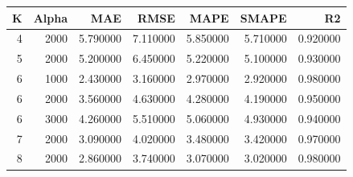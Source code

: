 \begin{tabular}{rrrrrrr}
\toprule
K & Alpha & MAE & RMSE & MAPE & SMAPE & R2 \\
\midrule
4 & 2000 & 5.790000 & 7.110000 & 5.850000 & 5.710000 & 0.920000 \\
5 & 2000 & 5.200000 & 6.450000 & 5.220000 & 5.100000 & 0.930000 \\
6 & 1000 & 2.430000 & 3.160000 & 2.970000 & 2.920000 & 0.980000 \\
6 & 2000 & 3.560000 & 4.630000 & 4.280000 & 4.190000 & 0.950000 \\
6 & 3000 & 4.260000 & 5.510000 & 5.060000 & 4.930000 & 0.940000 \\
7 & 2000 & 3.090000 & 4.020000 & 3.480000 & 3.420000 & 0.970000 \\
8 & 2000 & 2.860000 & 3.740000 & 3.070000 & 3.020000 & 0.980000 \\
\bottomrule
\end{tabular}
